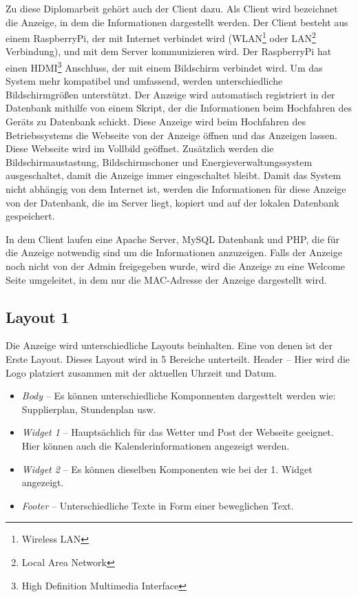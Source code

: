 Zu diese Diplomarbeit geh\"{o}rt auch der Client dazu. Als Client wird bezeichnet die Anzeige, in dem die Informationen dargestellt werden. Der Client besteht aus einem RaspberryPi, der mit Internet verbindet wird (WLAN\footnote{Wireless LAN} oder LAN\footnote{Local Area Network} Verbindung), und mit dem Server kommunizieren wird. Der RaspberryPi hat einen HDMI\footnote{High Definition Multimedia Interface} Anschluss, der mit einem Bildschirm verbindet wird. Um das System mehr kompatibel und umfassend, werden unterschiedliche Bildschirmgr\"{o}\ss{}en unterst\"{u}tzt. Der Anzeige wird automatisch registriert in der Datenbank mithilfe von einem Skript, der die Informationen beim Hochfahren des Ger\"{a}ts zu Datenbank schickt. Diese Anzeige wird beim Hochfahren des Betriebssystems die Webseite von der Anzeige \"{o}ffnen und das Anzeigen lassen. Diese Webseite wird im Vollbild ge\"{o}ffnet. Zus\"{a}tzlich werden die Bildschirmaustastung, Bildschirmschoner und Energieverwaltungssystem ausgeschaltet, damit die Anzeige immer eingeschaltet bleibt. Damit das System nicht abh\"{a}ngig von dem Internet ist, werden die Informationen f\"{u}r diese Anzeige von der Datenbank, die im Server liegt, kopiert und auf der lokalen Datenbank gespeichert. 

In dem Client laufen eine Apache Server, MySQL Datenbank und PHP, die f\"{u}r die Anzeige notwendig sind um die Informationen anzuzeigen. Falls der Anzeige noch nicht von der Admin freigegeben wurde, wird die Anzeige zu eine Welcome Seite umgeleitet, in dem nur die MAC-Adresse der Anzeige dargestellt wird.

\subsection{Layout 1}
Die Anzeige wird unterschiedliche Layouts beinhalten. Eine von denen ist der Erste Layout. Dieses Layout wird in 5 Bereiche unterteilt.
Header – Hier wird die Logo platziert zusammen mit der aktuellen Uhrzeit und Datum.
\begin{itemize}
	\item \textit{Body} – Es können unterschiedliche Komponnenten dargesttelt werden wie: Supplierplan, Stundenplan usw.
	\item \textit{Widget 1} – Hauptsächlich für das Wetter und Post der Webseite geeignet. Hier können auch die Kalenderinformationen angezeigt werden.
	\item \textit{Widget 2} – Es können dieselben Komponenten wie bei der 1. Widget angezeigt.
	\item \textit{Footer} – Unterschiedliche Texte in Form einer beweglichen Text.
	
\end{itemize}

